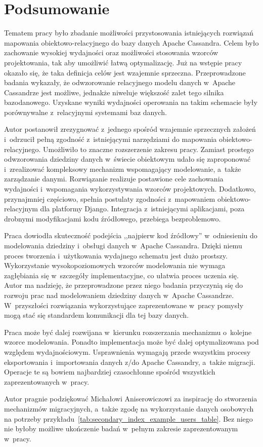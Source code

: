 
\chapter{Podsumowanie}
\label{chap:summary}

Tematem pracy było zbadanie możliwości przystosowania istniejących rozwiązań mapowania obiektowo-relacyjnego do bazy danych Apache Cassandra. Celem było zachowanie wysokiej wydajności oraz możliwości stosowania wzorców projektowania, tak aby umożliwić łatwą optymalizację. Już na wstępie pracy okazało się, że taka definicja celów jest wzajemnie sprzeczna. Przeprowadzone badania wykazały, że odwzorowanie relacyjnego modelu danych w~Apache Cassandrze jest możliwe, jednakże niweluje większość zalet tego silnika bazodanowego. Uzyskane wyniki wydajności operowania na takim schemacie były porównywalne z~relacyjnymi systemami baz danych.

Autor postanowił zrezygnować z~jednego spośród wzajemnie sprzecznych założeń i~odrzucił pełną zgodność z~istniejącymi narzędziami do mapowania obiektowo-relacyjnego. Umożliwiło to znaczne rozszerzenie zakresu pracy. Zamiast prostego odwzorowania dziedziny danych w~świecie obiektowym udało się zaproponować i~zrealizować kompleksowy mechanizm wspomagający modelowanie, a~także zarządzanie danymi. Rozwiązanie realizuje postawione cele zachowania wydajności i~wspomagania wykorzystywania wzorców projektowych. Dodatkowo, przynajmniej częściowo, spełnia postulaty zgodności z~mapowaniem obiektowo-relacyjnym dla platformy Django. Integracja z~istniejącymi aplikacjami, poza drobnymi modyfikacjami kodu źródłowego, przebiega bezproblemowo.

Praca dowiodła skuteczność podejścia ,,najpierw kod źródłowy'' w~odniesieniu do modelowania dziedziny i~obsługi danych w~Apache Cassandra. Dzięki niemu proces tworzenia i~użytkowania wydajnego schematu jest dużo prostszy. Wykorzystanie wysokopoziomowych wzorców modelowania nie wymaga zagłębiania się w~szczegóły implementacyjne, co ułatwia proces uczenia się. Autor ma nadzieję, że przeprowadzone przez niego badania przyczynią się do rozwoju prac nad modelowaniem dziedziny danych w~Apache Cassandrze. W~przyszłości rozwiązania wykorzystujące zaprezentowane w~pracy pomysły mogą stać się standardem komunikacji dla tej bazy danych.

Praca może być dalej rozwijana w~kierunku rozszerzania mechanizmu o~kolejne wzorce modelowania. Ponadto implementacja może być dalej optymalizowana pod względem wydajnościowym. Usprawnienia wymagają przede wszystkim procesy eksportowania i~importowania danych z/do Apache Cassandry, a~także migracji. Operacje te są bowiem najbardziej czasochłonne spośród wszystkich zaprezentowanych w~pracy.

Autor pragnie podziękować Michałowi Aniserowiczowi za inspirację do stworzenia mechanizmów migracyjnych, a~także zgodę na wykorzystanie danych osobowych na potrzeby przykładu~\ref{tab:secondary_index_example_users_table}. Bez niego nie byłoby możliwe ukończenie badań w~pełnym zakresie zaprezentowanym w~pracy.
